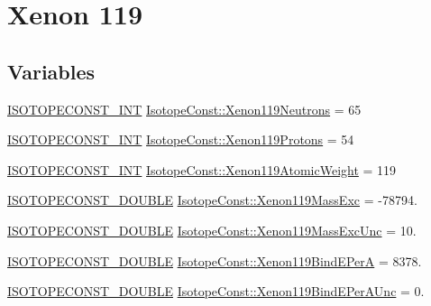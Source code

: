 \hypertarget{group___isotope_const-_xenon-_xe119}{}\section{Xenon 119}
\label{group___isotope_const-_xenon-_xe119}
\subsection*{Variables}
\begin{DoxyCompactItemize}
\item 
\mbox{\hyperlink{group___isotope_const-_macros_ga5f18360b3e99483a35c32d789e62621c}{I\+S\+O\+T\+O\+P\+E\+C\+O\+N\+S\+T\+\_\+\+I\+NT}} \mbox{\hyperlink{group___isotope_const-_xenon-_xe119_ga8c92c8542808436c2ba3852360b1e61d}{Isotope\+Const\+::\+Xenon119\+Neutrons}} = 65
\item 
\mbox{\hyperlink{group___isotope_const-_macros_ga5f18360b3e99483a35c32d789e62621c}{I\+S\+O\+T\+O\+P\+E\+C\+O\+N\+S\+T\+\_\+\+I\+NT}} \mbox{\hyperlink{group___isotope_const-_xenon-_xe119_ga97e50e75c9fae9973cfc34ae9ddd1ba9}{Isotope\+Const\+::\+Xenon119\+Protons}} = 54
\item 
\mbox{\hyperlink{group___isotope_const-_macros_ga5f18360b3e99483a35c32d789e62621c}{I\+S\+O\+T\+O\+P\+E\+C\+O\+N\+S\+T\+\_\+\+I\+NT}} \mbox{\hyperlink{group___isotope_const-_xenon-_xe119_gacf0f4448949388f241f04b2992286f0a}{Isotope\+Const\+::\+Xenon119\+Atomic\+Weight}} = 119
\item 
\mbox{\hyperlink{group___isotope_const-_macros_ga8f45a7272ce02c0b4c65c44636ed719a}{I\+S\+O\+T\+O\+P\+E\+C\+O\+N\+S\+T\+\_\+\+D\+O\+U\+B\+LE}} \mbox{\hyperlink{group___isotope_const-_xenon-_xe119_gacc5667a31a1e7951483e651005e7709e}{Isotope\+Const\+::\+Xenon119\+Mass\+Exc}} = -\/78794.
\item 
\mbox{\hyperlink{group___isotope_const-_macros_ga8f45a7272ce02c0b4c65c44636ed719a}{I\+S\+O\+T\+O\+P\+E\+C\+O\+N\+S\+T\+\_\+\+D\+O\+U\+B\+LE}} \mbox{\hyperlink{group___isotope_const-_xenon-_xe119_gab48040396598ed40fe05714ee589eba5}{Isotope\+Const\+::\+Xenon119\+Mass\+Exc\+Unc}} = 10.
\item 
\mbox{\hyperlink{group___isotope_const-_macros_ga8f45a7272ce02c0b4c65c44636ed719a}{I\+S\+O\+T\+O\+P\+E\+C\+O\+N\+S\+T\+\_\+\+D\+O\+U\+B\+LE}} \mbox{\hyperlink{group___isotope_const-_xenon-_xe119_ga3085e5787193aea13cb4ae979106ba4e}{Isotope\+Const\+::\+Xenon119\+Bind\+E\+PerA}} = 8378.
\item 
\mbox{\hyperlink{group___isotope_const-_macros_ga8f45a7272ce02c0b4c65c44636ed719a}{I\+S\+O\+T\+O\+P\+E\+C\+O\+N\+S\+T\+\_\+\+D\+O\+U\+B\+LE}} \mbox{\hyperlink{group___isotope_const-_xenon-_xe119_gaf0dfd31054935e0c2676a1711c2421db}{Isotope\+Const\+::\+Xenon119\+Bind\+E\+Per\+A\+Unc}} = 0.

\end{DoxyCompactItemize}
